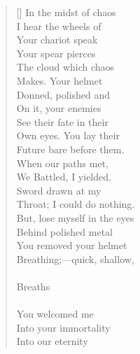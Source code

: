 \documentclass{article}
\begin{document}
\newpage
{}
\settowidth{\versewidth}{Than Tycho Brahe, or Erra Pater:}
\begin{verse}[\versewidth]
In the midst of chaos \\
I hear the wheels of \\
Your chariot speak \\
Your spear pierces \\
The cloud which chaos \\
Makes. Your helmet \\
Donned, polished and \\
On it, your enemies \\
See their fate in their \\
Own eyes. You lay their \\
Future bare before them. \\
When our paths met, \\
We Battled, I yielded. \\
Sword drawn at my \\
Throat; I could do nothing. \\
But, lose myself in the eyes \\
Behind polished metal \\
You removed your helmet \\
Breathing;––quick, shallow, \\
\\
Breaths \\
\\
You welcomed me \\
Into your immortality \\
Into our eternity \\
\end{verse}
\end{document}
